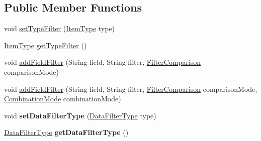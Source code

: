 \subsection*{Public Member Functions}
\begin{DoxyCompactItemize}
\item 
void \hyperlink{classcom_1_1ualberta_1_1team17_1_1datamanager_1_1_data_filter_ab97f07f4e7313ba3da2555c39d6c9bc3}{set\+Type\+Filter} (\hyperlink{enumcom_1_1ualberta_1_1team17_1_1_item_type}{Item\+Type} type)
\item 
\hyperlink{enumcom_1_1ualberta_1_1team17_1_1_item_type}{Item\+Type} \hyperlink{classcom_1_1ualberta_1_1team17_1_1datamanager_1_1_data_filter_ac276395e60c793fba5933a83b6c8d125}{get\+Type\+Filter} ()
\item 
void \hyperlink{classcom_1_1ualberta_1_1team17_1_1datamanager_1_1_data_filter_a97018db86362064f7bfdea6ff42843f3}{add\+Field\+Filter} (String field, String filter, \hyperlink{enumcom_1_1ualberta_1_1team17_1_1datamanager_1_1_data_filter_1_1_filter_comparison}{Filter\+Comparison} comparison\+Mode)
\item 
void \hyperlink{classcom_1_1ualberta_1_1team17_1_1datamanager_1_1_data_filter_a9bd0a1010dc4d49ede4ba3210810abdc}{add\+Field\+Filter} (String field, String filter, \hyperlink{enumcom_1_1ualberta_1_1team17_1_1datamanager_1_1_data_filter_1_1_filter_comparison}{Filter\+Comparison} comparison\+Mode, \hyperlink{enumcom_1_1ualberta_1_1team17_1_1datamanager_1_1_data_filter_1_1_combination_mode}{Combination\+Mode} combination\+Mode)
\item 
\hypertarget{classcom_1_1ualberta_1_1team17_1_1datamanager_1_1_data_filter_a77923badfade04eea47309f663c3f799}{void {\bfseries set\+Data\+Filter\+Type} (\hyperlink{enumcom_1_1ualberta_1_1team17_1_1datamanager_1_1_data_filter_1_1_data_filter_type}{Data\+Filter\+Type} type)}\label{classcom_1_1ualberta_1_1team17_1_1datamanager_1_1_data_filter_a77923badfade04eea47309f663c3f799}

\item 
\hypertarget{classcom_1_1ualberta_1_1team17_1_1datamanager_1_1_data_filter_a8024e202d7e12422a8c2d49b4650acbe}{\hyperlink{enumcom_1_1ualberta_1_1team17_1_1datamanager_1_1_data_filter_1_1_data_filter_type}{Data\+Filter\+Type} {\bfseries get\+Data\+Filter\+Type} ()}\label{classcom_1_1ualberta_1_1team17_1_1datamanager_1_1_data_filter_a8024e202d7e12422a8c2d49b4650acbe}


\end{DoxyCompactItemize}
